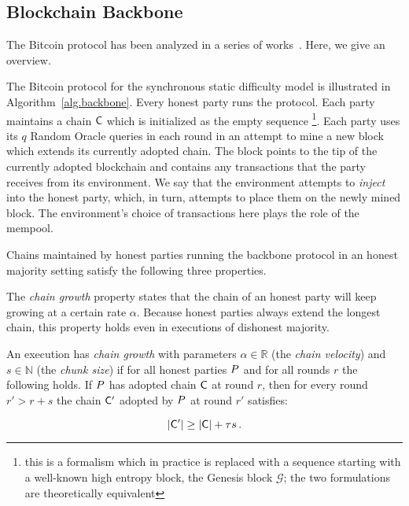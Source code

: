 \subsection{Blockchain Backbone}

The Bitcoin protocol has been analyzed in a series of
works~\cite{backbone,varbackbone,pass-asynchronous,composable-bitcoin}. Here, we
give an overview.

The Bitcoin protocol for the synchronous static difficulty model is illustrated
in Algorithm~\ref{alg.backbone}. Every honest party runs the protocol. Each
party maintains a chain $\mathsf{C}$ which is initialized as the empty sequence
\footnote{this is a formalism which in practice is replaced with a sequence
starting with a well-known high entropy block, the Genesis block $\mathcal{G}$;
the two formulations are theoretically equivalent}. Each party uses its $q$
Random Oracle queries in each round in an attempt to mine a new block which
extends its currently adopted chain. The block points to the tip of the
currently adopted blockchain and contains any transactions that the party
receives from its environment. We say that the environment attempts to
\emph{inject} into the honest party, which, in turn, attempts to place them on
the newly mined block. The environment's choice of transactions here plays the
role of the mempool.




Chains maintained by honest parties running the backbone protocol in an honest
majority setting satisfy the following three properties.

The \emph{chain growth} property states that the chain of an honest party will
keep growing at a certain rate $\alpha$. Because honest parties always extend the
longest chain, this property holds even in executions of dishonest majority.

\begin{definition}
  An execution has \emph{chain growth} with parameters $\alpha \in \mathbb{R}$
  (the \emph{chain velocity}) and $s \in \mathbb{N}$ (the \emph{chunk size}) if
  for all honest parties $P$ and for all rounds $r$ the following holds. If
  $P$ has adopted chain $\mathsf{C}$ at round $r$, then for every round $r' > r
  + s$ the chain $\mathsf{C}'$ adopted by $P$ at round $r'$ satisfies:

  \[
  |\mathsf{C}'| \geq |\mathsf{C}| + \tau s
  \,.
  \]
\end{definition}

